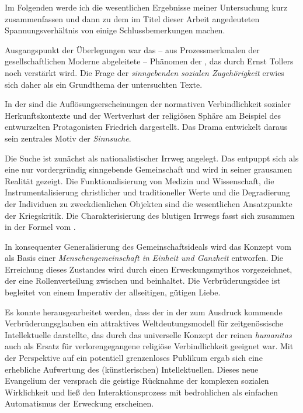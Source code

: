 
Im Folgenden werde ich die wesentlichen Ergebnisse meiner Untersuchung 
kurz zusammenfassen und dann zu dem im Titel dieser Arbeit angedeuteten
Spannungsverhältnis von \Cite{Weltverbesserung und Isolation} einige
Schlussbemerkungen machen.


Ausgangspunkt der Überlegungen war das -- aus Prozessmerkmalen der
gesellschaftlichen Moderne abgeleitete -- Phänomen der \Cite{Identitätskrise
  des modernen Subjekts}, das durch Ernst Tollers \Cite{soziale Randlage}
noch verstärkt wird. Die Frage der \emph{sinngebenden sozialen Zugehörigkeit}
erwies sich daher als ein Grundthema der untersuchten Texte. 

In der  sind die Auflösungserscheinungen der normativen
Verbindlichkeit sozialer Herkunftskontexte und der Wertverlust der religiösen
Sphäre am Beispiel des entwurzelten Protagonisten Friedrich dargestellt. Das
Drama entwickelt daraus sein zentrales Motiv der \emph{Sinnsuche}.

Die Suche ist zunächst als nationalistischer Irrweg angelegt. Das
\Cite{Vaterland} entpuppt sich als eine nur vordergründig sinngebende
Gemeinschaft und wird in seiner grausamen Realität gezeigt. 
Die Funktionalisierung von Medizin und Wissenschaft, die Instrumentalisierung
christlicher und traditioneller Werte und die Degradierung der Individuen zu
zweckdienlichen Objekten sind die wesentlichen Ansatzpunkte der Kriegskritik.
Die Charakterisierung des blutigen Irrwegs fasst sich zusammen in der Formel
vom \Cite{Tod als Feind des Geistes}.  

In konsequenter Generalisierung des Gemeinschaftsideals wird das Konzept
vom \Cite{Neuen Menschen} als Basis einer \emph{Menschengemeinschaft in
Einheit und Ganzheit} entworfen. Die Erreichung dieses Zustandes wird durch
einen Erweckungsmythos vorgezeichnet, der eine Rollenverteilung zwischen
\Cite{Geistigen} und \Cite{Volk} beinhaltet. Die Verbrüderungsidee ist
begleitet von einem Imperativ der allseitigen, gütigen Liebe.

Es konnte herausgearbeitet werden, dass der in der  zum
Ausdruck kommende Verbrüderungsglauben ein attraktives Weltdeutungsmodell für
zeitgenössische Intellektuelle darstellte, das durch das universelle Konzept
der reinen \emph{humanitas} auch als Ersatz für verlorengegangene religiöse
Verbindlichkeit geeignet war. Mit der Perspektive auf ein potentiell
grenzenloses Publikum ergab sich eine erhebliche Aufwertung des
(künstlerischen) Intellektuellen. Dieses neue Evangelium der
 versprach die geistige Rücknahme der
komplexen sozialen Wirklichkeit und ließ den Interaktionsprozess mit
bedrohlichen  als einfachen Automatismus der Erweckung
erscheinen.

